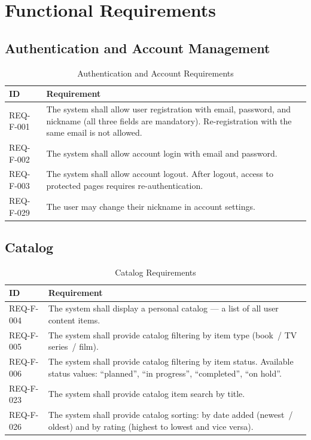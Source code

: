 \section{Functional Requirements}
\label{sec:funktsionalni-vymohy}

\subsection{Authentication and Account Management}

\begin{table}[h]
\caption{Authentication and Account Requirements}
\label{tab:auth}
\begin{tabular}{L{2.5cm} L{11.5cm}}
\toprule
\textbf{ID} & \textbf{Requirement} \\
\midrule
REQ-F-001 & The system shall allow user registration with email, password, and nickname (all three fields are mandatory). Re-registration with the same email is not allowed.  \\
\addlinespace
REQ-F-002 & The system shall allow account login with email and password.  \\
\addlinespace
REQ-F-003 & The system shall allow account logout. After logout, access to protected pages requires re-authentication.  \\
\addlinespace
REQ-F-029 & The user may change their nickname in account settings.  \\
\bottomrule
\end{tabular}
\end{table}

\subsection{Catalog}

\begin{table}[h]
\caption{Catalog Requirements}
\label{tab:kataloh}
\begin{tabular}{L{2.5cm} L{11.5cm}}
\toprule
\textbf{ID} & \textbf{Requirement} \\
\midrule
REQ-F-004 & The system shall display a personal catalog --- a list of all user content items.  \\
\addlinespace
REQ-F-005 & The system shall provide catalog filtering by item type (book~/ TV series~/ film).  \\
\addlinespace
REQ-F-006 & The system shall provide catalog filtering by item status. Available status values: ``planned'', ``in progress'', ``completed'', ``on hold''.  \\
\addlinespace
REQ-F-023 & The system shall provide catalog item search by title.  \\
\addlinespace
REQ-F-026 & The system shall provide catalog sorting: by date added (newest~/ oldest) and by rating (highest to lowest and vice versa).  \\
\bottomrule
\end{tabular}
\end{table}

